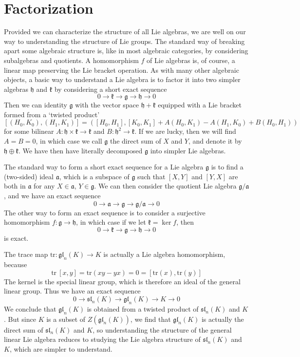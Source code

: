 \section{Factorization}

Provided we can characterize the structure of all Lie algebras, we are well on our way to understanding the structure of Lie groups. The standard way of breaking apart some algebraic structure is, like in most algebraic categories, by considering subalgebras and quotients. A homomorphism $f$ of Lie algebras is, of course, a linear map preserving the Lie bracket operation. As with many other algebraic objects, a basic way to understand a Lie algebra is to factor it into two simpler algebras $\mathfrak{h}$ and $\mathfrak{k}$ by considering a short exact sequence
%
\[ 0 \to \mathfrak{k} \to \mathfrak{g} \to \mathfrak{h} \to 0 \]
%
Then we can identity $\mathfrak{g}$ with the vector space $\mathfrak{h} + \mathfrak{k}$ equipped with a Lie bracket formed from a `twisted product'
%
\[ [(H_0,K_0), (H_1,K_1)] = \left([H_0,H_1], [K_0,K_1] + A(H_0,K_1) - A(H_1,K_0) + B(H_0,H_1) \right) \]
%
for some bilinear $A: \mathfrak{h} \times \mathfrak{k} \to \mathfrak{k}$ and $B: \mathfrak{h}^2 \to \mathfrak{k}$. If we are lucky, then we will find $A = B = 0$, in which case we call $\mathfrak{g}$ the direct sum of $X$ and $Y$, and denote it by $\mathfrak{h} \oplus \mathfrak{k}$. We have then have literally decomposed $\mathfrak{g}$ into simpler Lie algebras.

The standard way to form a short exact sequence for a Lie algebra $\mathfrak{g}$ is to find a (two-sided) ideal $\mathfrak{a}$, which is a subspace of $\mathfrak{g}$ such that $[X,Y]$ and $[Y,X]$ are both in $\mathfrak{a}$ for any $X \in \mathfrak{a}$, $Y \in \mathfrak{g}$. We can then consider the quotient Lie algebra $\mathfrak{g}/\mathfrak{a}$, and we have an exact sequence
%
\[ 0 \to \mathfrak{a} \to \mathfrak{g} \to \mathfrak{g}/\mathfrak{a} \to 0 \]
%
The other way to form an exact sequence is to consider a surjective homomorphism $f: \mathfrak{g} \to \mathfrak{h}$, in which case if we let $\mathfrak{k} = \ker f$, then
%
\[ 0 \to \mathfrak{k} \to \mathfrak{g} \to \mathfrak{h} \to 0 \]
%
is exact.

\begin{example}
    The trace map $\text{tr}: \mathfrak{gl}_n(K) \to K$ is actually a Lie algebra homomorphism, because
    \[ \text{tr}\ [x,y] = \text{tr}(xy - yx) = 0 = [\text{tr}(x), \text{tr}(y)] \]
    The kernel is the special linear group, which is therefore an ideal of the general linear group. Thus we have an exact sequence
    \[ 0 \to \mathfrak{sl}_n(K) \to \mathfrak{gl}_n(K) \to K \to 0 \]
    We conclude that $\mathfrak{gl}_n(K)$ is obtained from a twisted product of $\mathfrak{sl}_n(K)$ and $K$. But since $K$ is a subset of $Z(\mathfrak{gl}_n(K))$, we find that $\mathfrak{gl}_n(K)$ is actually the direct sum of $\mathfrak{sl}_n(K)$ and $K$, so understanding the structure of the general linear Lie algebra reduces to studying the Lie algebra structure of $\mathfrak{sl}_n(K)$ and $K$, which are simpler to understand.
\end{example}

